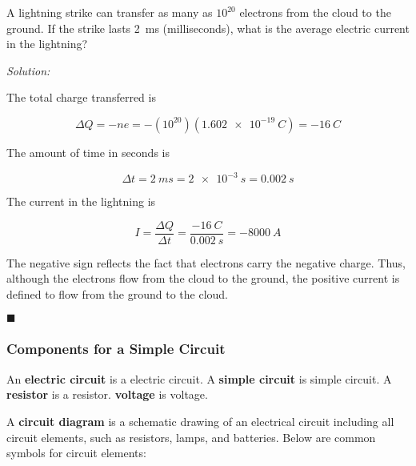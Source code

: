 \documentclass[dvipsnames]{article}
\begin{document}
\begin{example}
    A lightning strike can transfer as many as $10^{20}$ electrons from the cloud to the ground. If the strike lasts \SI{2}{ms} (milliseconds), what is the average electric current in the lightning?
\end{example}

\textit{Solution:}

The total charge transferred is

\begin{equation*}
    \Delta Q = -ne = -(10^{20})(\SI{1.602e-19}{C}) = \SI{-16}{C}
\end{equation*}

The amount of time in seconds is

\begin{equation*}
    \Delta t = \SI{2}{ms} = \SI{2e-3}{s} = \SI{0.002}{s}
\end{equation*}

The current in the lightning is

\begin{equation*}
    I = \frac{\Delta Q}{\Delta t} = \frac{-\SI{16}{C}}{\SI{0.002}{s}} = \SI{-8000}{A}
\end{equation*}

The negative sign reflects the fact that electrons carry the negative charge. Thus, although the electrons flow from the cloud to the ground, the positive current is defined to flow from the ground to the cloud.

\hfill $\blacksquare$

\subsubsection{Components for a Simple Circuit}

An \textbf{\gls{electric circuit}} is a \glsdesc{electric circuit}. A \textbf{\gls{simple circuit}} is \glsdesc{simple circuit}. A \textbf{\gls{resistor}} is a \glsdesc{resistor}. \textbf{\Gls{voltage}} is \glsdesc{voltage}.



A \textbf{circuit diagram} is a schematic drawing of an electrical circuit including all circuit elements, such as resistors, lamps, and batteries. Below are common symbols for circuit elements:
\end{document}
